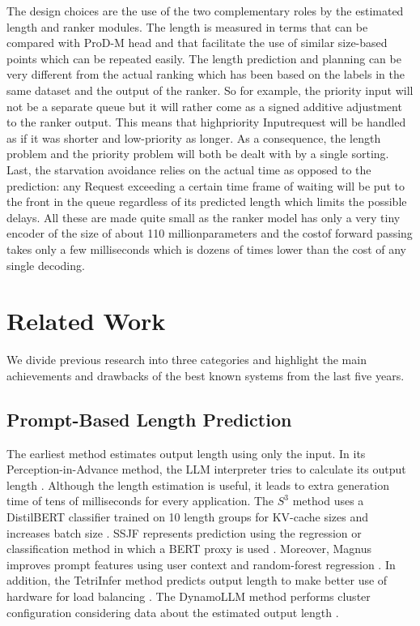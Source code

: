 \documentclass[conference]{IEEEtran}
\begin{document}
The design choices are the use of the two complementary roles by the estimated length and ranker modules. The length is measured in terms that can be compared with ProD-M head and that facilitate the use of similar size-based points which can be repeated easily. The length prediction and planning can be very different from the actual ranking which has been based on the labels in the same dataset and the output of the ranker. So for example, the priority input will not be a separate queue but it will rather come as a signed additive adjustment to the ranker output. This means that highpriority Inputrequest will be handled as if it was shorter and low-priority as longer. As a consequence, the length problem and the priority problem will both be dealt with by a single sorting. Last, the starvation avoidance relies on the actual time as opposed to the prediction: any Request exceeding a certain time frame of waiting will be put to the front in the queue regardless of its predicted length which limits the possible delays. All these are made quite small as the ranker model has only a very tiny encoder of the size of about 110 millionparameters and the costof forward passing takes only a few milliseconds which is dozens of times lower than the cost of any single decoding.

\section{Related Work}
\label{sec:related-work}
We divide previous research into three categories and highlight the main achievements and drawbacks of the best known systems from the last five years.

\subsection{Prompt-Based Length Prediction}\label{sec:prompt-based}
The earliest method estimates output length using only the input. In its Perception-in-Advance method, the LLM interpreter tries to calculate its output length \cite{zheng2023response}. Although the length estimation is useful, it leads to extra generation time of tens of milliseconds for every application. The $S^3$ method uses a DistilBERT classifier trained on 10 length groups for KV-cache sizes and increases batch size \cite{jin2023s3}. SSJF represents prediction using the regression or classification method in which a BERT proxy is used \cite{qiu2024ssjf}. Moreover, Magnus improves prompt features using user context and random-forest regression \cite{cheng2024magnus}. In addition, the TetriInfer method predicts output length to make better use of hardware for load balancing \cite{hu2024tetriinfer}. The DynamoLLM method performs cluster configuration considering data about the estimated output length \cite{stojkovic2024dynamollm}.
\end{document}
